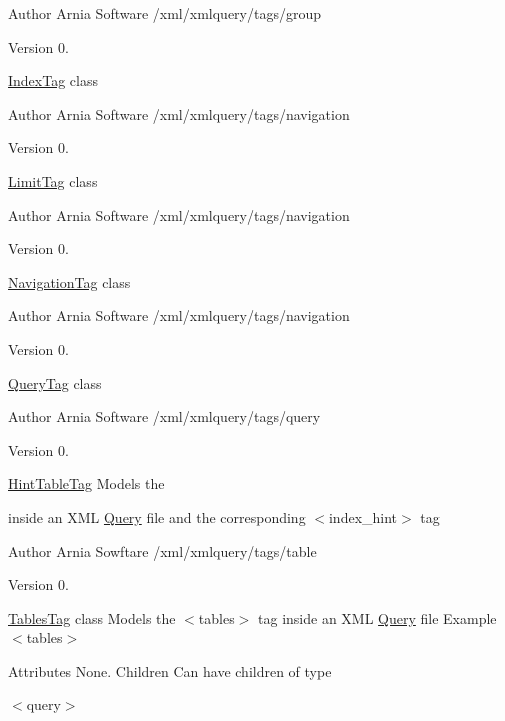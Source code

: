 \begin{DoxyAuthor}{Author}
Arnia Software /xml/xmlquery/tags/group 
\end{DoxyAuthor}
\begin{DoxyVersion}{Version}
0.
\end{DoxyVersion}
\hyperlink{classIndexTag}{Index\-Tag} class

\begin{DoxyAuthor}{Author}
Arnia Software /xml/xmlquery/tags/navigation 
\end{DoxyAuthor}
\begin{DoxyVersion}{Version}
0.
\end{DoxyVersion}
\hyperlink{classLimitTag}{Limit\-Tag} class

\begin{DoxyAuthor}{Author}
Arnia Software /xml/xmlquery/tags/navigation 
\end{DoxyAuthor}
\begin{DoxyVersion}{Version}
0.
\end{DoxyVersion}
\hyperlink{classNavigationTag}{Navigation\-Tag} class

\begin{DoxyAuthor}{Author}
Arnia Software /xml/xmlquery/tags/navigation 
\end{DoxyAuthor}
\begin{DoxyVersion}{Version}
0.
\end{DoxyVersion}
\hyperlink{classQueryTag}{Query\-Tag} class

\begin{DoxyAuthor}{Author}
Arnia Software /xml/xmlquery/tags/query 
\end{DoxyAuthor}
\begin{DoxyVersion}{Version}
0.
\end{DoxyVersion}
\hyperlink{classHintTableTag}{Hint\-Table\-Tag} Models the \begin{TabularC}{0}
\hline
\end{TabularC}
inside an X\-M\-L \hyperlink{classQuery}{Query} file and the corresponding $<$index\-\_\-hint$>$ tag

\begin{DoxyAuthor}{Author}
Arnia Sowftare /xml/xmlquery/tags/table 
\end{DoxyAuthor}
\begin{DoxyVersion}{Version}
0.
\end{DoxyVersion}
\hyperlink{classTablesTag}{Tables\-Tag} class Models the $<$tables$>$ tag inside an X\-M\-L \hyperlink{classQuery}{Query} file  Example $<$tables$>$ \begin{TabularC}{0}
\hline
\end{TabularC}
Attributes None. Children Can have children of type \begin{TabularC}{0}
\hline
\end{TabularC}
$<$query$>$

